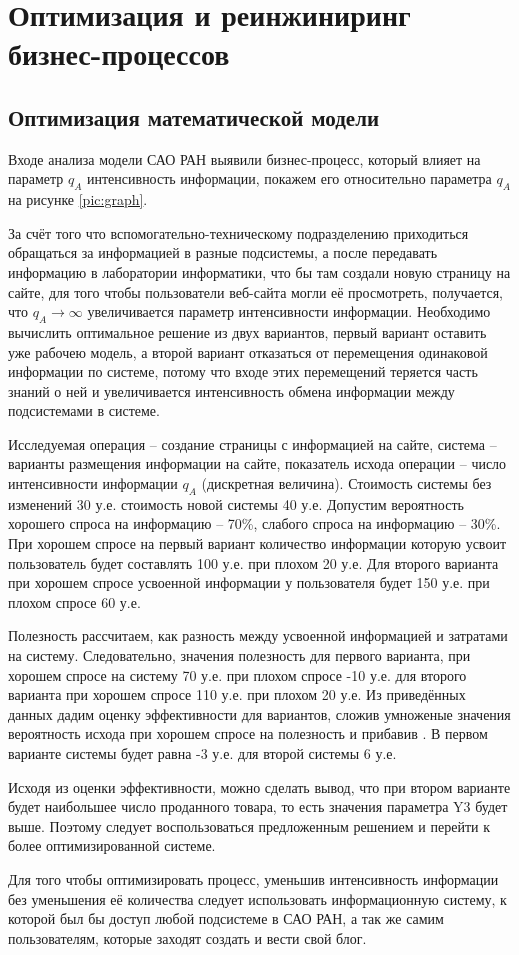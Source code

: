 \section{Оптимизация и реинжиниринг бизнес-процессов}
\subsection{Оптимизация математической модели}
Входе анализа модели САО РАН выявили бизнес-процесс, который влияет на параметр $q_A$ интенсивность информации, покажем его относительно параметра $q_A$ на рисунке \ref{pic:graph}.


За счёт того что вспомогательно-техническому подразделению приходиться обращаться за информацией в разные подсистемы, а после передавать информацию в лаборатории информатики, что бы там создали новую страницу на сайте, для того чтобы пользователи веб-сайта могли её просмотреть, получается, что $q_A \rightarrow \infty$ увеличивается параметр интенсивности информации.
Необходимо вычислить оптимальное решение из двух вариантов, первый вариант оставить уже рабочею модель, а второй вариант отказаться от перемещения одинаковой информации по системе, потому что входе этих перемещений теряется часть знаний о ней и увеличивается интенсивность обмена информации между подсистемами в системе.

Исследуемая операция – создание страницы с информацией на сайте, система – варианты размещения информации на сайте, показатель исхода операции – число интенсивности информации $q_A$ (дискретная величина). Стоимость системы без изменений 30 у.е. стоимость новой системы 40 у.е. Допустим вероятность хорошего спроса на информацию -- 70\%, слабого спроса на информацию -- 30\%. При хорошем спросе на первый вариант количество информации которую усвоит пользователь будет составлять 100 у.е. при плохом 20 у.е. Для второго варианта при хорошем спросе усвоенной информации у пользователя будет 150 у.е. при плохом спросе 60 у.е.

Полезность рассчитаем, как разность между усвоенной информацией и затратами на систему. Следовательно, значения полезность для первого варианта, при хорошем спросе на систему 70 у.е. при плохом спросе -10 у.е. для второго варианта при хорошем спросе 110 у.е. при плохом 20 у.е.
Из приведённых данных дадим оценку эффективности для вариантов, сложив умноженые значения вероятность исхода при хорошем спросе на полезность и прибавив  . В первом варианте  системы будет равна -3 у.е. для второй системы 6 у.е.

Исходя из оценки эффективности, можно сделать вывод, что при втором варианте будет наибольшее число проданного товара, то есть значения параметра Y3 будет выше. Поэтому следует воспользоваться предложенным решением и перейти к более оптимизированной системе. 

 Для того чтобы оптимизировать процесс, уменьшив интенсивность информации без уменьшения её количества следует использовать информационную систему, к которой был бы доступ любой подсистеме в САО РАН, а так же самим пользователям, которые заходят создать и вести свой блог.
\pagebreak